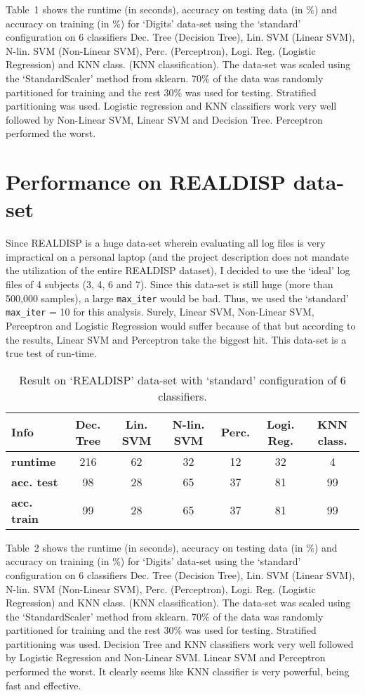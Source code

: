 \documentclass[12pt]{article}
\begin{document}
Table~1 shows the runtime (in seconds), accuracy on testing data (in \%) and accuracy on training (in \%) for `Digits' data-set using the `standard' configuration on 6 classifiers Dec. Tree (Decision Tree), Lin. SVM (Linear SVM), N-lin. SVM (Non-Linear SVM), Perc. (Perceptron), Logi. Reg. (Logistic Regression) and KNN class. (KNN classification). The data-set was scaled using the `StandardScaler' method from sklearn. 70\% of the data was randomly partitioned for training and the rest 30\% was used for testing. Stratified partitioning was used. Logistic regression and KNN classifiers work very well followed by Non-Linear SVM, Linear SVM and Decision Tree. Perceptron performed the worst.

\section*{Performance on REALDISP data-set}

Since REALDISP is a huge data-set wherein evaluating all log files is very impractical on a personal laptop (and the project description does not mandate the utilization of the entire REALDISP dataset),  I decided to use the `ideal' log files of 4 subjects (3, 4, 6 and 7). Since this data-set is still huge (more than 500,000 samples), a large \texttt{max\_iter} would be bad. Thus, we used the `standard' \texttt{max\_iter} = 10 for this analysis. Surely, Linear SVM, Non-Linear SVM, Perceptron and Logistic Regression would suffer because of that but according to the results, Linear SVM and Perceptron take the biggest hit. This data-set is a true test of run-time.

\begin{table}[!hptb]
\begin{tabular}{|l|c|c|c|c|c|c|}
\hline
\textbf{Info} & \textbf{Dec. Tree} & \textbf{Lin. SVM} & \textbf{N-lin. SVM} & \textbf{Perc.} & \textbf{Logi. Reg.} & \textbf{KNN class.} \\\hline
\textbf{runtime} & 216 & 62 & 32 & 12 & 32 & 4 \\
\textbf{acc. test} & 98 & 28 & 65 & 37 & 81 & 99 \\
\textbf{acc. train} & 99 & 28 & 65 & 37 & 81 & 99 \\\hline
\end{tabular}
\caption{Result on `REALDISP' data-set with `standard' configuration of 6 classifiers.}
\end{table}

Table~2 shows the runtime (in seconds), accuracy on testing data (in \%) and accuracy on training (in \%) for `Digits' data-set using the `standard' configuration on 6 classifiers Dec. Tree (Decision Tree), Lin. SVM (Linear SVM), N-lin. SVM (Non-Linear SVM), Perc. (Perceptron), Logi. Reg. (Logistic Regression) and KNN class. (KNN classification). The data-set was scaled using the `StandardScaler' method from sklearn. 70\% of the data was randomly partitioned for training and the rest 30\% was used for testing. Stratified partitioning was used. Decision Tree and KNN classifiers work very well followed by Logistic Regression and Non-Linear SVM. Linear SVM and Perceptron performed the worst. It clearly seems like KNN classifier is very powerful, being fast and effective.
\end{document}
